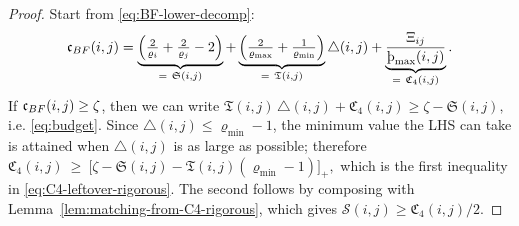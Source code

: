 \documentclass[10pt,a4paper]{amsart}
\newcommand{\sho}{\textup{\text{\th}}}
\begin{document}
\begin{proof}
Start from \eqref{eq:BF-lower-decomp}:
\[
\mathfrak c_{\rm BF}(i,j)
=\underbrace{\Big(\tfrac{2}{\varrho_i}+\tfrac{2}{\varrho_j}-2\Big)}_{=\ \mathfrak S(i,j)}
+\underbrace{\Big(\tfrac{2}{\varrho_{\max}}+\tfrac{1}{\varrho_{\min}}\Big)}_{=\ \mathfrak T(i,j)}\triangle(i,j)
+\underbrace{\frac{\Xi_{ij}}{\sho_{\max}(i,j)}}_{=\ \mathfrak C_4(i,j)}.
\]
If $\mathfrak c_{\rm BF}(i,j)\ge \zeta$, then we can write
\(
\mathfrak T(i,j)\,\triangle(i,j)+\mathfrak C_4(i,j)\ge \zeta-\mathfrak S(i,j),
\)
i.e. \eqref{eq:budget}. Since $\triangle(i,j)\le \varrho_{\min}-1$, the minimum value the LHS can take is attained when $\triangle(i,j)$ is as large as possible; therefore
\(
\mathfrak C_4(i,j)\ \ge\ \bigl[\zeta-\mathfrak S(i,j)-\mathfrak T(i,j)(\varrho_{\min}-1)\bigr]_+,
\)
which is the first inequality in \eqref{eq:C4-leftover-rigorous}. The second follows by composing with Lemma~\ref{lem:matching-from-C4-rigorous}, which gives $\mathscr S(i,j)\ge \mathfrak C_4(i,j)/2$.
\end{proof}
\end{document}
